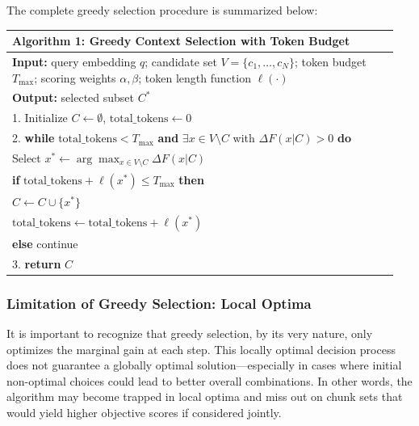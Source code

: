 \documentclass[11pt]{article}
\begin{document}
The complete greedy selection procedure is summarized below:
\begin{table}[h]
	\centering
	\renewcommand{\arraystretch}{1.2}
	\begin{tabular}{p{0.95\linewidth}}
		\hline
		\textbf{Algorithm 1: Greedy Context Selection with Token Budget} \\ \hline
		
		\textbf{Input:} query embedding $q$; candidate set $V=\{c_1,\ldots,c_N\}$; token budget $T_{\max}$; scoring weights $\alpha,\beta$; token length function $\ell(\cdot)$ \\
		
		\textbf{Output:} selected subset $C^*$ \\
		
		1. Initialize $C \leftarrow \emptyset$, $\text{total\_tokens} \leftarrow 0$ \\
		
		2. \textbf{while} $\text{total\_tokens} < T_{\max}$ \textbf{and } $\exists x \in V\setminus C$ with  $\Delta F(x|C)>0$ \textbf{do} \\
		\hspace{1em} Select $x^* \leftarrow \arg\max_{x \in V\setminus C} \Delta F(x|C)$ \\
		\hspace{1em} \textbf{if} $\text{total\_tokens} + \ell(x^*) \leq T_{\max}$ \textbf{then} \\
		\hspace{2em} $C \leftarrow C \cup \{x^*\}$ \\
		\hspace{2em} $\text{total\_tokens} \leftarrow \text{total\_tokens} + \ell(x^*)$ \\
		\hspace{1em} \textbf{else} continue \\
		
		3. \textbf{return} $C$ \\
		\hline
	\end{tabular}
\end{table}


\subsubsection{Limitation of Greedy Selection: Local Optima}

It is important to recognize that greedy selection, by its very nature, only optimizes the marginal gain at each step. This locally optimal decision process does not guarantee a globally optimal solution—especially in cases where initial non-optimal choices could lead to better overall combinations. In other words, the algorithm may become trapped in local optima and miss out on chunk sets that would yield higher objective scores if considered jointly.
\end{document}
